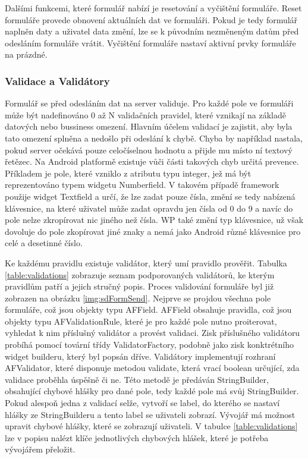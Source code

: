 Dalšími funkcemi, které formulář nabízí je resetování a vyčištění formuláře. Reset formuláře provede obnovení aktuálních dat ve formuláři. Pokud je tedy formulář naplněn daty a uživatel data změní, lze se k původním nezměneným datům před odesláním formuláře vrátit. Vyčištění formuláře nastaví aktivní prvky formuláře na prázdné.

\subsubsection{Validace a Validátory}
Formulář se před odesláním dat na server validuje. Pro každé pole ve formuláři může být nadefinováno 0 až N validačních pravidel, které vznikají na základě datových nebo bussiness omezení. Hlavním účelem validací je zajistit, aby byla tato omezení splněna a nedošlo při odeslání k chybě. Chyba by například nastala, pokud server očekává pouze celočíselnou hodnotu a přijde mu místo ní textový řetězec. Na Android platformě existuje vůči části takových chyb určitá prevence. Příkladem je pole, které vzniklo z atributu typu integer, jež má být reprezentováno typem widgetu Numberfield. V takovém případě framework použije widget Textfield a určí, že lze zadat pouze čísla, změní se tedy nabízená klávesnice, na které uživatel může zadat opravdu jen čísla od 0 do 9 a navíc do pole nelze zkropírovat nic jiného než čísla. WP také změní typ klávesnice, už však dovoluje do pole zkopírovat jiné znaky a nemá jako Android různé klávesnice pro celé a desetinné číslo.

Ke každému pravidlu existuje validátor, který umí pravidlo prověřit. Tabulka \ref{table:validations} zobrazuje seznam podporovaných validátorů, ke kterým pravidlům patří a jejich stručný popis. Proces validování formuláře byl již zobrazen na obrázku \ref{img:sdFormSend}. Nejprve se projdou všechna pole formuláře, což jsou objekty typu AFField. AFField obsahuje pravidla, což jsou objekty typu AFValidationRule, které je pro každé pole nutno proiterovat, vyhledat k nim příslušný validátor a provést validaci. Zisk příslušného validátoru probíhá pomocí tovární třídy ValidatorFactory, podobně jako zisk konktrétního widget builderu, který byl popsán dříve. Validátory implementují rozhraní AFValidator, které disponuje metodou validate, která vrací boolean určující, zda validace proběhla úspěšně či ne. Této metodě je předáván StringBuilder, obsahující chybové hlášky pro dané pole, tedy každé pole má svůj StringBuilder. Pokud alespoň jedna z validací selže, vytvoří se label, do kterého se nastaví hlášky ze StringBuilderu a tento label se uživateli zobrazí. Vývojář má možnost upravit chybové hlášky, které se zobrazují uživateli. V tabulce \ref{table:validations} lze v popisu nalézt klíče jednotlivých chybových hlášek, které je potřeba vývojářem přeložit.

